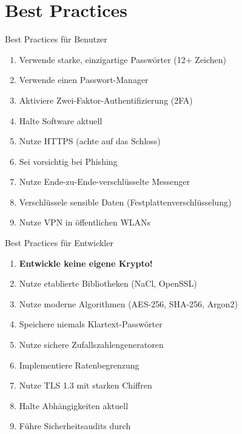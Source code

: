 \documentclass[handout]{beamer}
\begin{document}
\section{Best Practices}

\begin{frame}{Best Practices für Benutzer}
\begin{enumerate}
    \item Verwende starke, einzigartige Passwörter (12+ Zeichen)
    \item Verwende einen Passwort-Manager
    \item Aktiviere Zwei-Faktor-Authentifizierung (2FA)
    \item Halte Software aktuell
    \item Nutze HTTPS (achte auf das Schloss)
    \item Sei vorsichtig bei Phishing
    \item Nutze Ende-zu-Ende-verschlüsselte Messenger
    \item Verschlüssele sensible Daten (Festplattenverschlüsselung)
    \item Nutze VPN in öffentlichen WLANs
\end{enumerate}
\end{frame}

\begin{frame}{Best Practices für Entwickler}
\begin{enumerate}
    \item \textbf{Entwickle keine eigene Krypto!}
    \item Nutze etablierte Bibliotheken (NaCl, OpenSSL)
    \item Nutze moderne Algorithmen (AES-256, SHA-256, Argon2)
    \item Speichere niemals Klartext-Passwörter
    \item Nutze sichere Zufallszahlengeneratoren
    \item Implementiere Ratenbegrenzung
    \item Nutze TLS 1.3 mit starken Chiffren
    \item Halte Abhängigkeiten aktuell
    \item Führe Sicherheitsaudits durch
\end{enumerate}
\end{frame}
\end{document}
